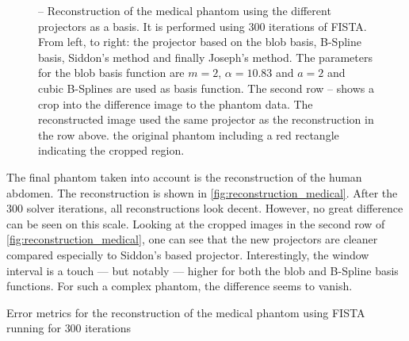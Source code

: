 \begin{figure}

	\caption{--
		Reconstruction of the medical phantom using the different projectors as a basis. It
		is performed using \(300\) iterations of \gls{FISTA}. From left, to right: the
		projector based on the blob basis, B-Spline basis, Siddon's method and finally
		Joseph's method. The parameters for the blob basis function are \(m=2\),
		\(\alpha=10.83\) and \(a=2\) and cubic B-Splines are used as basis function. The
		second row
		--
		shows a crop into the difference image to the phantom data. The reconstructed image
		used the same projector as the reconstruction in the row above.
		 the original phantom including a red rectangle
		indicating the cropped region.
	}%
	\label{fig:reconstruction_medical}
\end{figure}

The final phantom taken into account is the reconstruction of the human abdomen. The reconstruction
is shown in \autoref{fig:reconstruction_medical}. After the \(300\) solver iterations, all
reconstructions look decent. However, no great difference can be seen on this scale. Looking at the
cropped images in the second row of \autoref{fig:reconstruction_medical}, one can see that the new
projectors are cleaner compared especially to Siddon's based projector. Interestingly, the window
interval is a touch --- but notably --- higher for both the blob and B-Spline basis functions. For
such a complex phantom, the difference seems to vanish.

\begin{table}[h]%
	\centering
	\caption{Error metrics for the reconstruction of the medical phantom using FISTA running for
		\(300\) iterations}%
	\label{tab:error_metric_medical}
\end{table}

